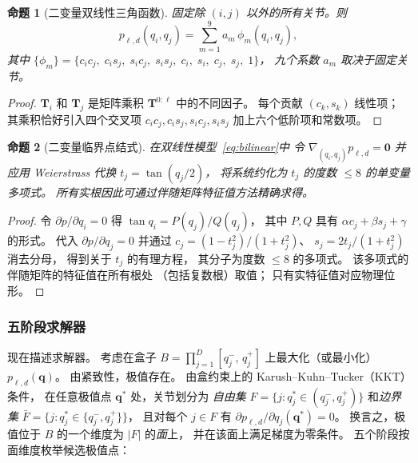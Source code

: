\documentclass[journal]{IEEEtran}
\newtheorem{proposition}{命题}
\newcommand{\bT}{\mathbf{T}}
\begin{document}
\begin{proposition}[二变量双线性三角函数]\label{prop:bilinear}
固定除 $(i,j)$ 以外的所有关节。则
\begin{equation}\label{eq:bilinear}
  p_{\ell,d}(q_i,q_j) = \sum_{m=1}^{9} a_m\,\phi_m(q_i,q_j),
\end{equation}
其中 $\{\phi_m\} = \{c_i c_j,\; c_i s_j,\; s_i c_j,\; s_i s_j,\;
c_i,\; s_i,\; c_j,\; s_j,\; 1\}$，
九个系数 $a_m$ 取决于固定关节。
\end{proposition}
\begin{proof}
$\bT_i$ 和 $\bT_j$ 是矩阵乘积 $\bT^{0:\ell}$ 中的不同因子。
每个贡献 $(c_k, s_k)$ 线性项；
其乘积恰好引入四个交叉项 $c_i c_j, c_i s_j, s_i c_j, s_i s_j$
加上六个低阶项和常数项。
\end{proof}

\begin{proposition}[二变量临界点结式]\label{prop:resultant}
在双线性模型~\eqref{eq:bilinear}中
令 $\nabla_{(q_i,q_j)} p_{\ell,d} = \bm{0}$
并应用 Weierstrass 代换 $t_j = \tan(q_j/2)$，
将系统约化为 $t_j$ 的度数 $\leq 8$ 的单变量多项式。
所有实根因此可通过伴随矩阵特征值方法精确求得。
\end{proposition}
\begin{proof}
令 $\partial p / \partial q_i = 0$ 得
$\tan q_i = P(q_j) / Q(q_j)$，
其中 $P,Q$ 具有 $\alpha c_j + \beta s_j + \gamma$ 的形式。
代入 $\partial p / \partial q_j = 0$
并通过 $c_j = (1-t_j^2)/(1+t_j^2)$、
$s_j = 2t_j/(1+t_j^2)$ 消去分母，
得到关于 $t_j$ 的有理方程，
其分子为度数 $\leq 8$ 的多项式。
该多项式的伴随矩阵的特征值在所有根处
（包括复数根）取值；
只有实特征值对应物理位形。
\end{proof}


\subsubsection{五阶段求解器}\label{sec:five_phase}

现在描述求解器。
考虑在盒子
$B = \prod_{j=1}^{D} [q_j^-,\, q_j^+]$
上最大化（或最小化）$p_{\ell,d}(\bm{q})$。
由紧致性，极值存在。
由盒约束上的 Karush--Kuhn--Tucker（KKT）条件，
在任意极值点 $\bm{q}^*$ 处，关节划分为
\emph{自由集} $F = \{j : q_j^* \in (q_j^-,q_j^+)\}$
和\emph{边界集}
$\bar F = \{j : q_j^* \in \{q_j^-,q_j^+\}\}$，
且对每个 $j \in F$ 有
$\partial p_{\ell,d}/\partial q_j(\bm{q}^*) = 0$。
换言之，极值位于 $B$ 的一个维度为 $|F|$ 的\emph{面}上，
并在该面上满足梯度为零条件。
五个阶段按面维度枚举候选极值点：
\end{document}
